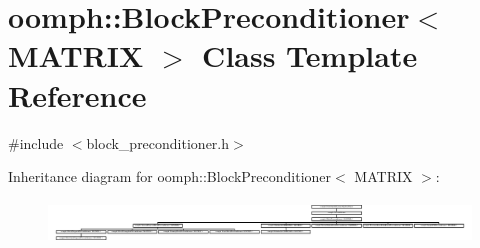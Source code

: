 \hypertarget{classoomph_1_1BlockPreconditioner}{}\section{oomph\+:\+:Block\+Preconditioner$<$ M\+A\+T\+R\+IX $>$ Class Template Reference}
\label{classoomph_1_1BlockPreconditioner}


{\ttfamily \#include $<$block\+\_\+preconditioner.\+h$>$}

Inheritance diagram for oomph\+:\+:Block\+Preconditioner$<$ M\+A\+T\+R\+IX $>$\+:\begin{figure}[H]
\begin{center}
\leavevmode
\includegraphics[height=1.160221cm]{classoomph_1_1BlockPreconditioner}
\end{center}
\end{figure}
